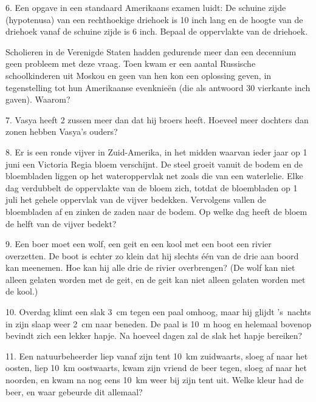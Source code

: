 \begin{problem}{6.}
	Een opgave in een standaard Amerikaans examen luidt: De schui\-ne zijde (hypotenusa) van een rechthoekige driehoek is 10 inch lang en de hoogte van de driehoek vanaf de schuine zijde is 6 inch. Bepaal de oppervlakte van de driehoek.

	Scholieren in de Verenigde Staten hadden gedurende meer dan een decennium geen probleem met deze vraag. Toen kwam er een aantal Russische schoolkinderen uit Moskou en geen van hen kon een oplossing geven, in tegenstelling tot hun Amerikaanse evenknieën (die als antwoord 30 vierkante inch gaven). Waarom?
\end{problem}

\begin{problem}{7.}
	Vasya heeft 2 zussen meer dan dat hij broers heeft. Hoeveel meer dochters dan zonen hebben Vasya's ouders?
\end{problem}

\begin{problem}{8.}
	Er is een ronde vijver in Zuid-Amerika, in het midden waarvan ieder jaar op 1 juni een Victoria Regia bloem verschijnt. De steel groeit vanuit de bodem en de bloembladen liggen op het wateroppervlak net zoals die van een waterlelie. Elke dag verdubbelt de oppervlakte van de bloem zich, totdat de bloembladen op 1 juli het gehele oppervlak van de vijver bedekken. Vervolgens vallen de bloembladen af en zinken de zaden naar de bodem. Op welke dag heeft de bloem de helft van de vijver bedekt?
\end{problem}

\begin{problem}{9.}
	Een boer moet een wolf, een geit en een kool met een boot een rivier overzetten. De boot is echter zo klein dat hij slechts één van de drie aan boord kan meenemen. Hoe kan hij alle drie de rivier overbrengen? (De wolf kan niet alleen gelaten worden met de geit, en de geit kan niet alleen gelaten worden met de kool.)
\end{problem}

\begin{problem}{10.}
	Overdag klimt een slak \SI{3}{\cm} tegen een paal omhoog, maar hij glijdt 's~nachts in zijn slaap weer \SI{2}{\cm} naar beneden. De paal is \SI{10}{\metre} hoog en helemaal bovenop bevindt zich een lekker hapje. Na hoeveel dagen zal de slak het hapje bereiken?
\end{problem}

\begin{problem}{11.}
	Een natuurbeheerder liep vanaf zijn tent \SI{10}{\km} zuidwaarts, sloeg af naar het oosten, liep \SI{10}{\km} oostwaarts, kwam zijn vriend de beer tegen, sloeg af naar het noorden, en kwam na nog eens \SI{10}{\km} weer bij zijn tent uit. Welke kleur had de beer, en waar gebeurde dit allemaal?
\end{problem}

